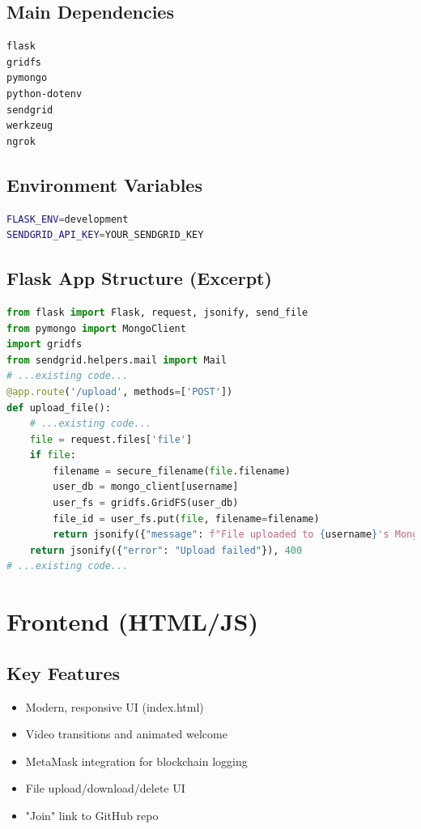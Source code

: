 \documentclass[a4paper, 12pt]{report}
\newenvironment{frontmatter}{}{}
\begin{document}
\begin{frontmatter}
\subsection{Main Dependencies}
\begin{lstlisting}[language=bash,caption={backend/requirements.txt}]
flask
gridfs
pymongo
python-dotenv
sendgrid
werkzeug
ngrok
\end{lstlisting}

\subsection{Environment Variables}
\begin{lstlisting}[language=bash,caption={backend/.env}]
FLASK_ENV=development
SENDGRID_API_KEY=YOUR_SENDGRID_KEY
\end{lstlisting}

\subsection{Flask App Structure (Excerpt)}
\begin{lstlisting}[language=Python,caption={backend/app.py}]
from flask import Flask, request, jsonify, send_file
from pymongo import MongoClient
import gridfs
from sendgrid.helpers.mail import Mail
# ...existing code...
@app.route('/upload', methods=['POST'])
def upload_file():
    # ...existing code...
    file = request.files['file']
    if file:
        filename = secure_filename(file.filename)
        user_db = mongo_client[username]
        user_fs = gridfs.GridFS(user_db)
        file_id = user_fs.put(file, filename=filename)
        return jsonify({"message": f"File uploaded to {username}'s MongoDB!", "file_id": str(file_id)})
    return jsonify({"error": "Upload failed"}), 400
# ...existing code...
\end{lstlisting}

\section{Frontend (HTML/JS)}
\subsection{Key Features}
\begin{itemize}
  \item Modern, responsive UI (index.html)
  \item Video transitions and animated welcome
  \item MetaMask integration for blockchain logging
  \item File upload/download/delete UI
  \item "Join" link to GitHub repo
\end{itemize}


\end{frontmatter}
\end{document}
